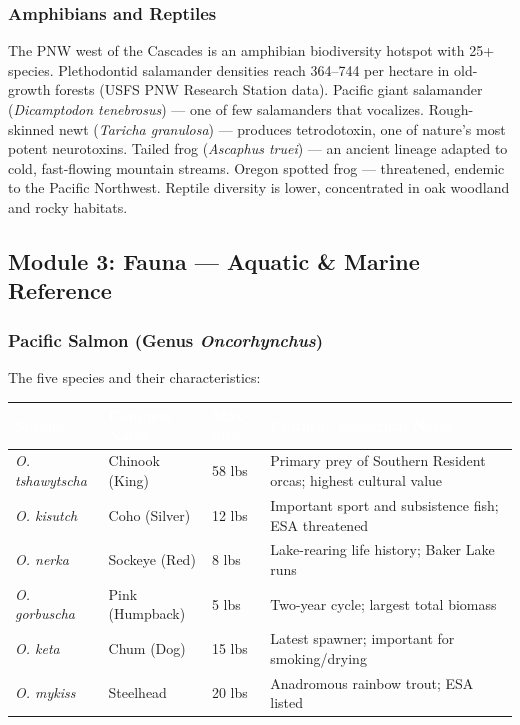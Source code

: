\documentclass[11pt,letterpaper]{article}
\newcommand{\tableheader}[1]{\textbf{\sffamily\textcolor{white}{#1}}}
\begin{document}
\subsubsection{Amphibians and Reptiles}

The PNW west of the Cascades is an amphibian biodiversity hotspot with 25+ species. Plethodontid salamander densities reach 364--744 per hectare in old-growth forests (USFS PNW Research Station data). Pacific giant salamander (\emph{Dicamptodon tenebrosus}) --- one of few salamanders that vocalizes. Rough-skinned newt (\emph{Taricha granulosa}) --- produces tetrodotoxin, one of nature's most potent neurotoxins. Tailed frog (\emph{Ascaphus truei}) --- an ancient lineage adapted to cold, fast-flowing mountain streams. Oregon spotted frog --- threatened, endemic to the Pacific Northwest. Reptile diversity is lower, concentrated in oak woodland and rocky habitats.

\subsection{Module 3: Fauna --- Aquatic \& Marine Reference}

\subsubsection{Pacific Salmon (Genus \emph{Oncorhynchus})}

The five species and their characteristics:

\begin{center}
\begin{tabularx}{\textwidth}{L{2.5cm}L{2.5cm}C{2cm}X}
\toprule
{}
\tableheader{Species} & \tableheader{Common Name} & \tableheader{Max Size} & \tableheader{Cultural/Ecological Notes} \\
\midrule
\emph{O. tshawytscha} & Chinook (King) & 58 lbs & Primary prey of Southern Resident orcas; highest cultural value \\
\emph{O. kisutch} & Coho (Silver) & 12 lbs & Important sport and subsistence fish; ESA threatened \\
\emph{O. nerka} & Sockeye (Red) & 8 lbs & Lake-rearing life history; Baker Lake runs \\
\emph{O. gorbuscha} & Pink (Humpback) & 5 lbs & Two-year cycle; largest total biomass \\
\emph{O. keta} & Chum (Dog) & 15 lbs & Latest spawner; important for smoking/drying \\
\emph{O. mykiss} & Steelhead & 20 lbs & Anadromous rainbow trout; ESA listed \\
\bottomrule
\end{tabularx}
\end{center}
\end{document}
